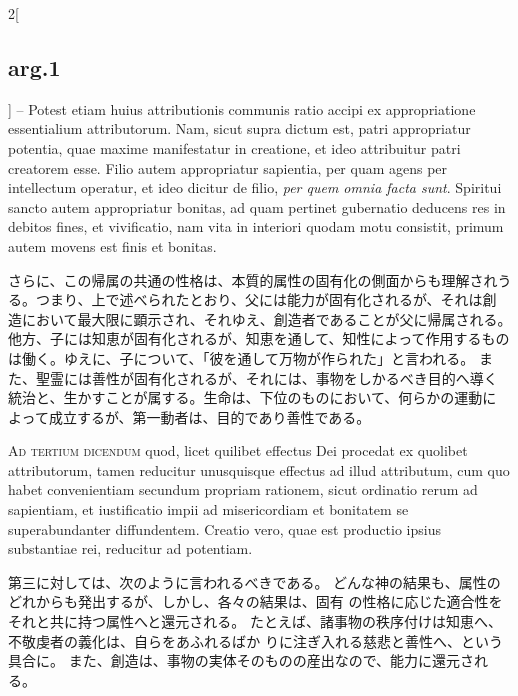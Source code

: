 \documentclass[paper=a4paper,fontsize=10pt,jafontsize=9pt,titlepage]{jlreq}
\begin{document}
\begin{paracol}{2}[\subsection{arg.1}]
-- Potest etiam huius attributionis communis
ratio accipi ex appropriatione essentialium attributorum. Nam, sicut
supra dictum est, patri appropriatur potentia, quae maxime manifestatur
in creatione, et ideo attribuitur patri creatorem esse. Filio autem
appropriatur sapientia, per quam agens per intellectum operatur, et ideo
dicitur de filio, {\itshape per quem omnia facta sunt}. Spiritui sancto autem
appropriatur bonitas, ad quam pertinet gubernatio deducens res in
debitos fines, et vivificatio, nam vita in interiori quodam motu
consistit, primum autem movens est finis et bonitas.

\switchcolumn

さらに、この帰属の共通の性格は、本質的属性の固有化の側面からも理解されう
 る。つまり、上で述べられたとおり、父には能力が固有化されるが、それは創
 造において最大限に顕示され、それゆえ、創造者であることが父に帰属される。
他方、子には知恵が固有化されるが、知恵を通して、知性によって作用するもの
 は働く。ゆえに、子について、「彼を通して万物が作られた」と言われる。
また、聖霊には善性が固有化されるが、それには、事物をしかるべき目的へ導く
 統治と、生かすことが属する。生命は、下位のものにおいて、何らかの運動に
 よって成立するが、第一動者は、目的であり善性である。

\switchcolumn*[\subsection{ad.3}]

{\scshape Ad tertium dicendum} quod, licet quilibet
effectus Dei procedat ex quolibet attributorum, tamen reducitur
unusquisque effectus ad illud attributum, cum quo habet convenientiam
secundum propriam rationem, sicut ordinatio rerum ad sapientiam, et
iustificatio impii ad misericordiam et bonitatem se superabundanter
diffundentem. Creatio vero, quae est productio ipsius substantiae rei,
reducitur ad potentiam.

\switchcolumn

第三に対しては、次のように言われるべきである。
どんな神の結果も、属性のどれからも発出するが、しかし、各々の結果は、固有
 の性格に応じた適合性をそれと共に持つ属性へと還元される。
たとえば、諸事物の秩序付けは知恵へ、不敬虔者の義化は、自らをあふれるばか
 りに注ぎ入れる慈悲と善性へ、という具合に。
また、創造は、事物の実体そのものの産出なので、能力に還元される。

\end{paracol}
\newpage
{}
{}
\setcounter{section}{7}
\setcounter{subsection}{0}
\end{document}
